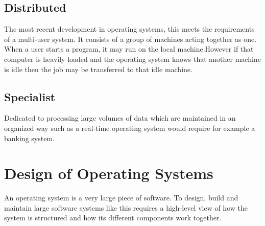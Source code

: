 \subsection*{Distributed}
The most recent development in operating systems, this meets the requirements of a multi-user system. It consists of a group of machines acting together as one. When a user starts a program, it may run on the local machine.However if that computer is heavily loaded and the operating system knows that another machine is idle then the job may be transferred to that idle machine.

\subsection*{Specialist}
Dedicated to processing large volumes of data which are maintained in an organized way such as a real-time operating system would require for example a banking system. 

\section*{Design of Operating Systems}
An operating system is a very large piece of software. To design, build and maintain large software systems like this requires a high-level view of how the system is structured and how its different components work together. 